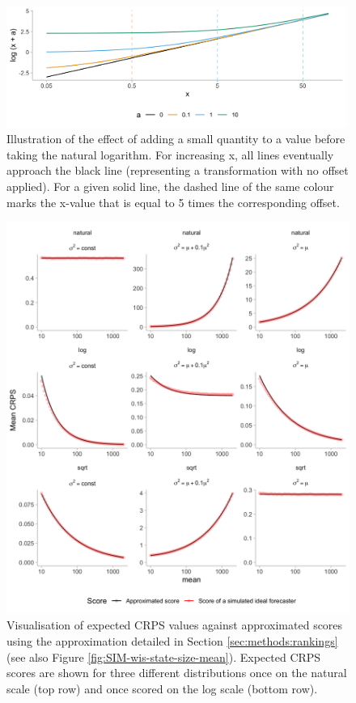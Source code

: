 \documentclass{article}
\begin{document}
\begin{figure}[h!]
    \centering
    \includegraphics[width=0.99\textwidth]{output/figures/illustration-effect-offset-log.png}
    \caption{Illustration of the effect of adding a small quantity to a value before taking the natural logarithm. For increasing x, all lines eventually approach the black line (representing a transformation with no offset applied).
    For a given solid line, the dashed line of the same colour marks the x-value that  is equal to 5 times the corresponding offset.}
    \label{fig:illustration-effect-log-offset}
\end{figure}


\begin{figure}[h!]
\centering
\includegraphics[width = 1\textwidth]{output/figures/SIM-score-approximation.png}
\caption{
Visualisation of expected CRPS values against approximated scores using the approximation detailed in Section \ref{sec:methods:rankings} (see also Figure \ref{fig:SIM-wis-state-size-mean}). Expected CRPS scores are shown for three different distributions once on the natural scale (top row) and once scored on the log scale (bottom row).  
}
\label{fig:score-approx}
\end{figure}
\end{document}
